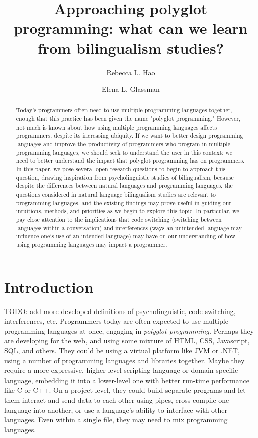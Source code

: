 \documentclass[a4paper,UKenglish,cleveref, autoref]{oasics-v2019}
\title{Approaching polyglot programming: what can we learn from bilingualism studies?}
\author{Rebecca L. Hao}{Department of Computer Science and Department of Linguistics, Harvard University, USA}{rhao@college.harvard.edu}{https://orcid.org/0000-0002-1310-2327}{}%
\author{Elena L. Glassman}{Department of Computer Science, Harvard University, USA}{glassman@seas.harvard.edu}{https://orcid.org/0000-0001-5178-3496}{}
\begin{document}
\maketitle

\begin{abstract}
Today's programmers often need to use multiple programming languages together, enough that this practice has been given the name "polyglot programming." However, not much is known about how using multiple programming languages affects programmers, despite its increasing ubiquity. If we want to better design programming languages and improve the productivity of programmers who program in multiple programming languages, we should seek to understand the user in this context: we need to better understand the impact that polyglot programming has on programmers. In this paper, we pose several open research questions to begin to approach this question, drawing inspiration from psycholinguistic studies of bilingualism, because despite the differences between natural languages and programming languages, the questions considered in natural language bilingualism studies are relevant to programming languages, and the existing findings may prove useful in guiding our intuitions, methods, and priorities as we begin to explore this topic. In particular, we pay close attention to the implications that code switching (switching between languages within a conversation) and interferences (ways an unintended language may influence one's use of an intended language) may have on our understanding of how using programming languages may impact a programmer. 
\end{abstract}

\section{Introduction}
\label{sec:typesetting-summary}

TODO: add more developed definitions of psycholinguistic, code switching, interferences, etc. 
Programmers today are often expected to use multiple programming languages at once, engaging in \textit{polyglot programming.} Perhaps they are developing for the web, and using some mixture of HTML, CSS, Javascript, SQL, and others. They could be using a virtual platform like JVM or .NET, using a number of programming languages and libraries together. Maybe they require a more expressive, higher-level scripting language or domain specific language, embedding it into a lower-level one with better run-time performance like C or C++. On a project level, they could build separate programs and let them interact and send data to each other using pipes, cross-compile one language into another, or use a language’s ability to interface with other languages. Even within a single file, they may need to mix programming languages. 
\end{document}
